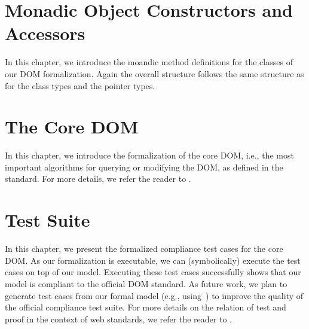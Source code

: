 \documentclass[10pt,DIV16,a4paper,abstract=true,twoside=semi,openright]
{scrreprt}
\begin{document}
\chapter{Monadic Object Constructors and Accessors}
\label{cha:monads}
In this chapter, we introduce the moandic method definitions for the
classes of our DOM formalization. Again the overall structure follows
the same structure as for the class types and the pointer types.







\chapter{The Core DOM}
\label{cha:dom}
In this chapter, we introduce the formalization of the core DOM, i.e.,
the most important algorithms for querying or modifying the DOM, as
defined in the standard. For more details, we refer the reader to
\cite{brucker.ea:core-dom:2018}.





\chapter{Test Suite}
\label{cha:tests}
In this chapter, we present the formalized compliance test cases for
the core DOM. As our formalization is executable, we can
(symbolically) execute the test cases on top of our model. Executing
these test cases successfully shows that our model is compliant to the
official DOM standard. As future work, we plan to generate test cases
from our formal model (e.g.,
using~\cite{brucker.ea:interactive:2005,brucker.ea:theorem-prover:2012})
to improve the quality of the official compliance test suite. For more
details on the relation of test and proof in the context of web
standards, we refer the reader to
\cite{brucker.ea:standard-compliance-testing:2018}.
 
 
 

{\small
  
  
}
\end{document}
